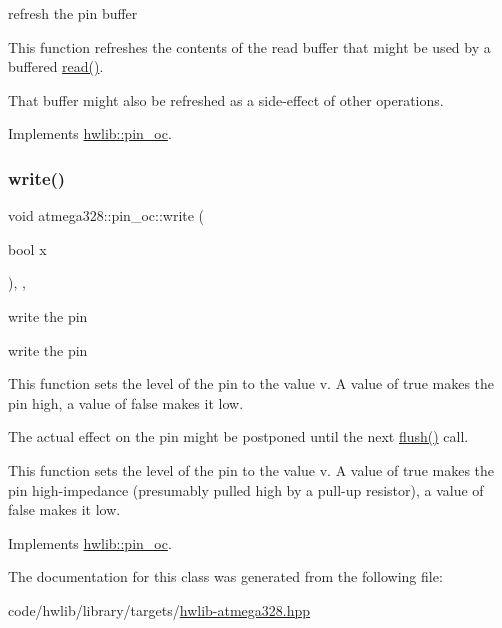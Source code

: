 refresh the pin buffer

This function refreshes the contents of the read buffer that might be used by a buffered \hyperlink{classatmega328_1_1pin__oc_a89733673f7d2e2e96b2b71dbabf4505a}{read()}.

That buffer might also be refreshed as a side-\/effect of other operations. 

Implements \hyperlink{classhwlib_1_1pin__oc_a573740f6f790c5792efc9cdd44cc73b3}{hwlib\+::pin\+\_\+oc}.

\mbox{\label{classatmega328_1_1pin__oc_a9eb229792f730515636057cd97609b43}} 
\subsubsection{\texorpdfstring{write()}{write()}}
{\footnotesize\ttfamily void atmega328\+::pin\+\_\+oc\+::write (\begin{DoxyParamCaption}\item[{bool}]{x }\end{DoxyParamCaption})\hspace{0.3cm}{\ttfamily [inline]}, {\ttfamily [override]}, {\ttfamily [virtual]}}





write the pin

write the pin

This function sets the level of the pin to the value v. A value of true makes the pin high, a value of false makes it low.

The actual effect on the pin might be postponed until the next \hyperlink{classatmega328_1_1pin__oc_a3eb816793385d952d5fb00f473b07349}{flush()} call.

This function sets the level of the pin to the value v. A value of true makes the pin high-\/impedance (presumably pulled high by a pull-\/up resistor), a value of false makes it low. 

Implements \hyperlink{classhwlib_1_1pin__oc_a4429dd7dc80858a213bb157f4ac5def3}{hwlib\+::pin\+\_\+oc}.



The documentation for this class was generated from the following file\+:\begin{DoxyCompactItemize}
\item 
code/hwlib/library/targets/\hyperlink{hwlib-atmega328_8hpp}{hwlib-\/atmega328.\+hpp}\end{DoxyCompactItemize}
